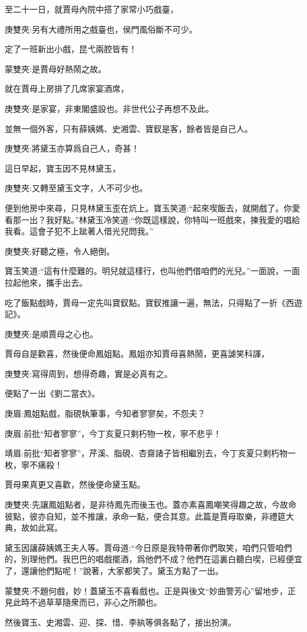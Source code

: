 \begin{parag}
    至二十一日，就賈母內院中搭了家常小巧戲臺，\begin{note}庚雙夾:另有大禮所用之戲臺也，侯門風俗斷不可少。\end{note}定了一班新出小戲，昆弋兩腔皆有！\begin{note}蒙雙夾:是賈母好熱鬧之故。\end{note}就在賈母上房排了几席家宴酒席，\begin{note}庚雙夾:是家宴，非東閣盛設也。非世代公子再想不及此。\end{note}並無一個外客，只有薛姨媽、史湘雲、寶釵是客，餘者皆是自己人。\begin{note}庚雙夾:將黛玉亦算爲自己人，奇甚！\end{note}這日早起，寶玉因不見林黛玉，\begin{note}庚雙夾:又轉至黛玉文字，人不可少也。\end{note}便到他房中來尋，只見林黛玉歪在炕上。寶玉笑道:“起來喫飯去，就開戲了。你愛看那一出？我好點。”林黛玉冷笑道:“你既這樣說，你特叫一班戲來，揀我愛的唱給我看。這會子犯不上跐著人借光兒問我。”\begin{note}庚雙夾:好聽之極，令人絕倒。\end{note}寶玉笑道:“這有什麼難的。明兒就這樣行，也叫他們借咱們的光兒。”一面說，一面拉起他來，攜手出去。
\end{parag}


\begin{parag}
    吃了飯點戲時，賈母一定先叫寶釵點。寶釵推讓一遍，無法，只得點了一折《西遊記》。\begin{note}庚雙夾:是順賈母之心也。\end{note}賈母自是歡喜，然後便命鳳姐點。鳳姐亦知賈母喜熱鬧，更喜謔笑科諢，\begin{note}庚雙夾:寫得周到，想得奇趣，實是必真有之。\end{note}便點了一出《劉二當衣》。\begin{note}庚眉:鳳姐點戲，脂硯執筆事，今知者寥寥矣，不怨夫？\end{note}\begin{note}庚眉:前批“知者寥寥”，今丁亥夏只剩朽物一枚，寧不悲乎！\end{note}\begin{note}靖眉:前批“知者寥寥”，芹溪、脂硯、杏齋諸子皆相繼別去，今丁亥夏只剩朽物一枚，寧不痛殺！\end{note}賈母果真更又喜歡，然後便命黛玉點。\begin{note}庚雙夾:先讓鳳姐點者，是非待鳳先而後玉也。蓋亦素喜鳳嘲笑得趣之故，今故命彼點，彼亦自知，並不推讓，承命一點，便合其意。此篇是賈母取樂，非禮筵大典，故如此寫。\end{note}黛玉因讓薛姨媽王夫人等。賈母道:“今日原是我特帶著你們取笑，咱們只管咱們的，別理他們。我巴巴的唱戲擺酒，爲他們不成？他們在這裏白聽白喫，已經便宜了，還讓他們點呢！”說著，大家都笑了。黛玉方點了一出。\begin{note}蒙雙夾:不題何戲，妙！蓋黛玉不喜看戲也。正是與後文“妙曲警芳心”留地步，正見此時不過草草隨衆而已，非心之所願也。\end{note}然後寶玉、史湘雲、迎、探、惜、李紈等俱各點了，接出扮演。
\end{parag}


